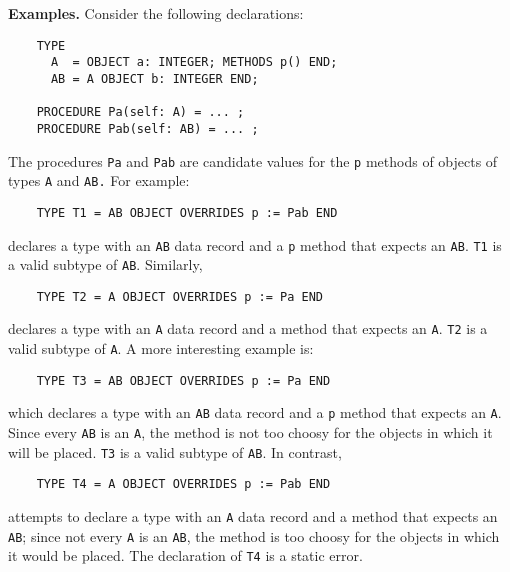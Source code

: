 \documentclass[10pt]{article}
\begin{document}
\textbf{Examples.}  Consider the following declarations:
\begin{verbatim}
    TYPE
      A  = OBJECT a: INTEGER; METHODS p() END;
      AB = A OBJECT b: INTEGER END;

    PROCEDURE Pa(self: A) = ... ;
    PROCEDURE Pab(self: AB) = ... ;
\end{verbatim}
The procedures \verb|Pa| and \verb|Pab| are candidate values for the \verb|p|
methods of objects of types \verb|A| and \verb|AB.| For example:
\begin{verbatim}
    TYPE T1 = AB OBJECT OVERRIDES p := Pab END
\end{verbatim}
declares a type with an \verb|AB| data record and a \verb|p| method that
expects an \verb|AB|.  \verb|T1| is a valid subtype of \verb|AB|.  Similarly,
\begin{verbatim}
    TYPE T2 = A OBJECT OVERRIDES p := Pa END
\end{verbatim}
declares a type with an \verb|A| data record and a method that expects an
\verb|A|.  \verb|T2| is a valid subtype of \verb|A|.  A more interesting
example is:
\begin{verbatim}
    TYPE T3 = AB OBJECT OVERRIDES p := Pa END
\end{verbatim}
which declares a type with an \verb|AB| data record and a \verb|p| method that
expects an \verb|A|.  Since every \verb|AB| is an \verb|A|, the method is not
too choosy for the objects in which it will be placed.  \verb|T3| is a valid
subtype of \verb|AB|.  In contrast,
\begin{verbatim}
    TYPE T4 = A OBJECT OVERRIDES p := Pab END
\end{verbatim}
attempts to declare a type with an \verb|A| data record and a method that
expects an \verb|AB|; since not every \verb|A| is an \verb|AB|, the method is
too choosy for the objects in which it would be placed.  The declaration of
\verb|T4| is a static error.
\end{document}
